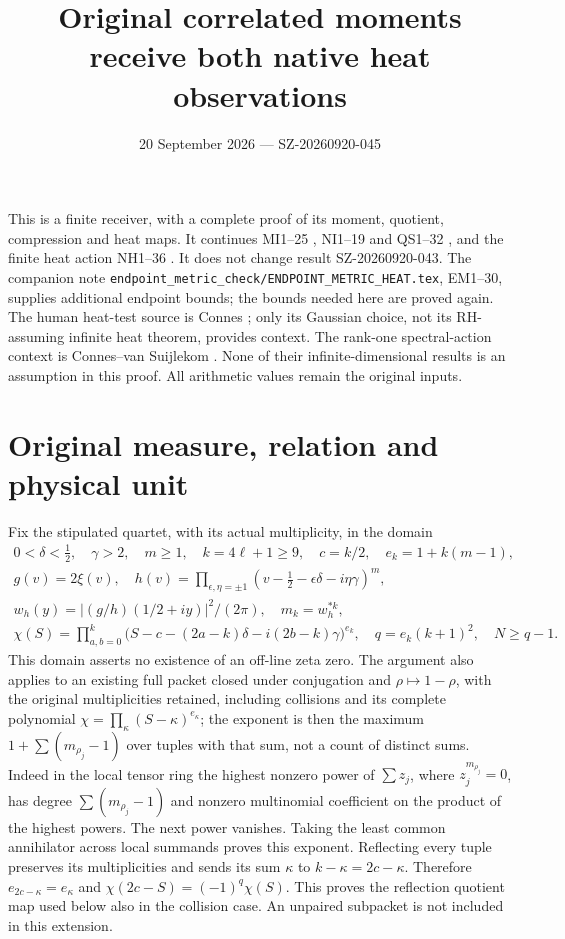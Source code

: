 \documentclass[11pt]{article}
\title{Original correlated moments receive both native heat observations}
\author{}\date{20 September 2026 --- SZ-20260920-045}
\begin{document}
\maketitle

This is a finite receiver, with a complete proof of its moment, quotient,
compression and heat maps. It continues MI1--25 \cite{MI}, NI1--19 and
QS1--32 \cite{NI}, and the finite heat action NH1--36 \cite{NH}.
It does not change result SZ-20260920-043. The companion note
\texttt{endpoint\_metric\_check/ENDPOINT\_METRIC\_HEAT.tex}, EM1--30,
supplies additional endpoint bounds; the bounds needed here are proved
again. The human heat-test source is Connes \cite{Connes}; only its
Gaussian choice, not its RH-assuming infinite heat theorem, provides
context. The rank-one spectral-action context is Connes--van Suijlekom
\cite{CV}. None of their infinite-dimensional results is an assumption
in this proof. All arithmetic values remain the original inputs.

\section{Original measure, relation and physical unit}

Fix the stipulated quartet, with its actual multiplicity, in the domain
\begin{equation}\tag{HR1}\label{HR1}
\begin{gathered}
0<\delta<\tfrac12,\quad\gamma>2,\quad m\ge1,\quad
k=4\ell+1\ge9,\quad c=k/2,\quad e_k=1+k(m-1),\\
g(v)=2\xi(v),\quad h(v)=\prod_{\epsilon,\eta=\pm1}
(v-\tfrac12-\epsilon\delta-i\eta\gamma)^m,\\
w_h(y)=|(g/h)(1/2+iy)|^2/(2\pi),\quad m_k=w_h^{*k},\\
\chi(S)=\prod_{a,b=0}^k
\bigl(S-c-(2a-k)\delta-i(2b-k)\gamma\bigr)^{e_k},\quad
q=e_k(k+1)^2,\quad N\ge q-1.
\end{gathered}
\end{equation}
This domain asserts no existence of an off-line zeta zero. The argument
also applies to an existing full packet closed under conjugation and
\(\rho\mapsto1-\rho\), with the original multiplicities retained,
including collisions and its complete polynomial
\(\chi=\prod_\kappa(S-\kappa)^{e_\kappa}\); the exponent is then the
maximum \(1+\sum(m_{\rho_j}-1)\) over tuples with that sum, not a count
of distinct sums. Indeed in the local tensor ring the highest nonzero
power of \(\sum z_j\), where \(z_j^{m_{\rho_j}}=0\), has degree
\(\sum(m_{\rho_j}-1)\) and nonzero multinomial coefficient on the
product of the highest powers. The next power vanishes. Taking the
least common annihilator across local summands proves this exponent.
Reflecting every tuple preserves its multiplicities and sends its sum
\(\kappa\) to \(k-\kappa=2c-\kappa\). Therefore
\(e_{2c-\kappa}=e_\kappa\) and
\(\chi(2c-S)=(-1)^q\chi(S)\). This proves the reflection quotient
map used below also in the collision case. An unpaired subpacket is
not included in this extension.
\end{document}
